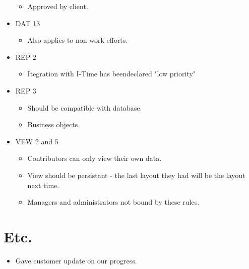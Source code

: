 \documentclass{article}
\begin{document}
\begin{itemize}
\begin{itemize}
	\item Approved by client.
	\end{itemize}
\item DAT 13
	\begin{itemize}
	\item Also applies to non-work efforts.
	\end{itemize}
\item REP 2
	\begin{itemize}
	\item Itegration with I-Time has beendeclared "low priority"
	\end{itemize}
\item REP 3
	\begin{itemize}
	\item Should be compatible with database.
	\item Business objects.
	\end {itemize}
\item VEW 2 and 5
	\begin{itemize}
	\item Contributors can only view their own data.
	\item View should be persistant - the last layout they had will be the layout next time.
	\item Managers and administrators not bound by these rules.
	\end{itemize}
\end{itemize}

\section{Etc.}
\begin{itemize}
\item Gave customer update on our progress.
\end{itemize}
 
\end{document}
